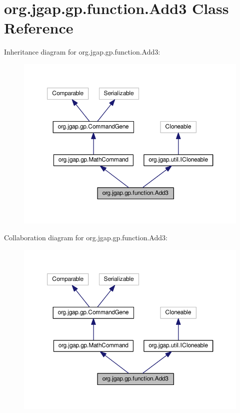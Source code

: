 \hypertarget{classorg_1_1jgap_1_1gp_1_1function_1_1_add3}{\section{org.\-jgap.\-gp.\-function.\-Add3 Class Reference}
\label{classorg_1_1jgap_1_1gp_1_1function_1_1_add3}
}


Inheritance diagram for org.\-jgap.\-gp.\-function.\-Add3\-:
\nopagebreak
\begin{figure}[H]
\begin{center}
\leavevmode
\includegraphics[width=350pt]{classorg_1_1jgap_1_1gp_1_1function_1_1_add3__inherit__graph}
\end{center}
\end{figure}


Collaboration diagram for org.\-jgap.\-gp.\-function.\-Add3\-:
\nopagebreak
\begin{figure}[H]
\begin{center}
\leavevmode
\includegraphics[width=350pt]{classorg_1_1jgap_1_1gp_1_1function_1_1_add3__coll__graph}
\end{center}
\end{figure}
